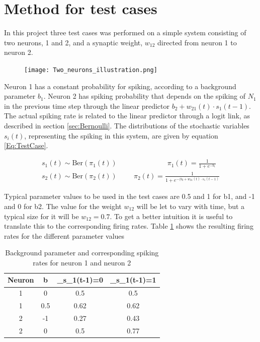 \section{Method for test cases}
\label{Method}

In this project three test cases was performed on a simple system consisting of two neurons, 1 and 2, and a synaptic weight, $w_{12}$ directed from neuron 1 to neuron 2.

\begin{figure}[h]
    \centering
    \texttt{[image: Two\_neurons\_illustration.png]}
\end{figure}

Neuron 1 has a constant probability for spiking, according to a background parameter $b_1$. Neuron 2 has spiking probability that depends on the spiking of $N_1$ in the previous time step through the linear predictor $b_2 + w_{21}(t) \cdot s_{1}(t-1)$. The actual spiking rate is related to the linear predictor through a logit link, as described in section \ref{sec:Bernoulli}. The distributions of the stochastic variables $s_{i}(t)$, representing the spiking in this system, are given by equation \ref{Eq:TestCase}.

\begin{equation}
\begin{split}
\label{Eq:TestCase}
    s_{1}(t) \sim \text{Ber}(\pi_{1}(t)) \hspace{3cm} \pi_{1}(t)= \frac{1}{1+e^{-b_1}} \\
    s_{2}(t) \sim \text{Ber}(\pi_{2}(t)) \hspace{1cm} \pi_{2}(t)= \frac{1}{1+e^{-(b_2 + w_{21}(t) \cdot s_{1}(t-1)}}
\end{split}
\end{equation}

Typical parameter values to be used in the test cases are 0.5 and 1 for b1, and -1 and 0 for b2. The value for the weight $w_{12}$ will be let to vary with time, but a typical size for it will be $w_{12}=0.7$. To get a better intuition it is useful to translate this to the corresponding firing rates. Table \ref{table:parameters} shows the resulting firing rates for the different parameter values


\begin{table}[!h]
\centering
\begin{tabular}{|c|c|c|c|}
	\hline
	Neuron & b & \pi_{s_{1}(t-1)=0} & \pi_{s_{1}(t-1)=1} \\
	\hline\hline
	1 & 0 & 0.5 & 0.5\\
	\hline
	1 & 0.5 & 0.62 & 0.62\\
	\hline
	2 & -1  & 0.27 & 0.43\\
	\hline
	2 & 0  & 0.5 & 0.77\\
	\hline
\end{tabular}
\caption{Background parameter and corresponding spiking rates for neuron 1 and neuron 2}
\label{table:parameters}
\end{table}

